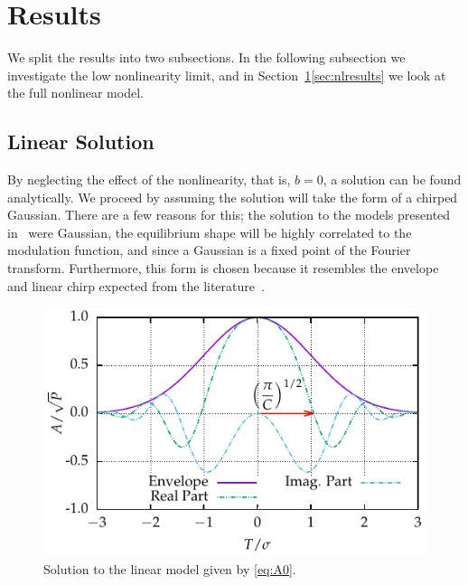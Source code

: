 \documentclass[9pt,twocolumn,twoside]{osajnl}
\begin{document}
\section{Results}
\label{sec:results}
We split the results into two subsections. In the following subsection we investigate the low nonlinearity limit, and in Section~\ref{sec:results}\ref{sec:nlresults} we look at the full nonlinear model.

\subsection{Linear Solution}
By neglecting the effect of the nonlinearity, that is, $b = 0$, a solution can be found analytically. We proceed by assuming the solution will take the form of a chirped Gaussian. There are a few reasons for this; the solution to the models presented in~\cite{cutler1955, siegman1969, kuizenga1970a, martinez1984, martinez1985} were Gaussian, the equilibrium shape will be highly correlated to the modulation function, and since a Gaussian is a fixed point of the Fourier transform. Furthermore, this form is chosen because it resembles the envelope and linear chirp expected from the literature~\cite{burgoyne2014, haus1975, haus1996, haus2000, usechak2005}.

\begin{figure}[tbp]
	\centering
	\includegraphics{Figures/Sample_Gauss}
	\caption{Solution to the linear model given by \eqref{eq:A0}.}
	\label{fig:samplegauss}
\end{figure}
\end{document}
